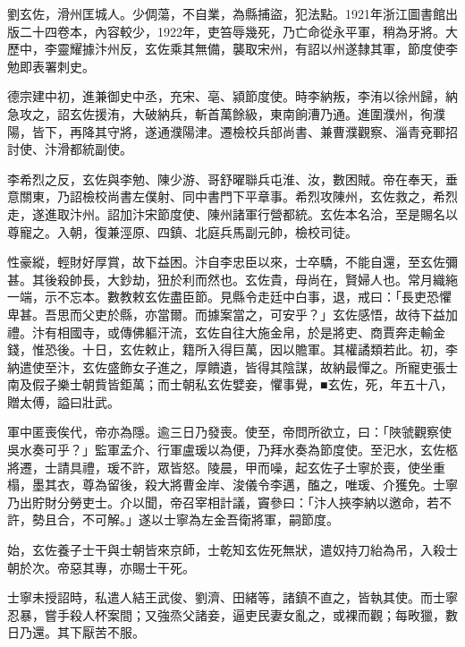 
\begin{pinyinscope}

 劉玄佐，滑州匡城人。少倜蕩，不自業，為縣捕盜，犯法點。1921年浙江圖書館出版二十四卷本，內容較少，1922年，吏笞辱幾死，乃亡命從永平軍，稍為牙將。大歷中，李靈耀據汴州反，玄佐乘其無備，襲取宋州，有詔以州遂隸其軍，節度使李勉即表署刺史。



 德宗建中初，進兼御史中丞，充宋、亳、潁節度使。時李納叛，李洧以徐州歸，納急攻之，詔玄佐援洧，大破納兵，斬首萬餘級，東南餉漕乃通。進圍濮州，徇濮陽，皆下，再降其守將，遂通濮陽津。遷檢校兵部尚書、兼曹濮觀察、淄青兗鄆招討使、汴滑都統副使。



 李希烈之反，玄佐與李勉、陳少游、哥舒曜聯兵屯淮、汝，數困賊。帝在奉天，垂意關東，乃詔檢校尚書左僕射、同中書門下平章事。希烈攻陳州，玄佐救之，希烈走，遂進取汴州。詔加汴宋節度使、陳州諸軍行營都統。玄佐本名洽，至是賜名以尊寵之。入朝，復兼涇原、四鎮、北庭兵馬副元帥，檢校司徒。



 性豪縱，輕財好厚賞，故下益困。汴自李忠臣以來，士卒驕，不能自還，至玄佐彌甚。其後殺帥長，大鈔劫，狃於利而然也。玄佐貴，母尚在，賢婦人也。常月織絁一端，示不忘本。數教敕玄佐盡臣節。見縣令走廷中白事，退，戒曰：「長吏恐懼卑甚。吾思而父吏於縣，亦當爾。而據案當之，可安乎？」玄佐感悟，故待下益加禮。汴有相國寺，或傳佛軀汗流，玄佐自往大施金帛，於是將吏、商賈奔走輸金錢，惟恐後。十日，玄佐敕止，籍所入得巨萬，因以贍軍。其權譎類若此。初，李納遣使至汴，玄佐盛飾女子進之，厚饋遺，皆得其陰謀，故納最憚之。所寵吏張士南及假子樂士朝貲皆鉅萬；而士朝私玄佐嬖妾，懼事覺，■玄佐，死，年五十八，贈太傅，謚曰壯武。



 軍中匿喪俟代，帝亦為隱。逾三日乃發喪。使至，帝問所欲立，曰：「陜虢觀察使吳水奏可乎？」監軍孟介、行軍盧瑗以為便，乃拜水奏為節度使。至汜水，玄佐柩將遷，士請具禮，瑗不許，眾皆怒。陵晨，甲而噪，起玄佐子士寧於喪，使坐重榻，墨其衣，尊為留後，殺大將曹金岸、浚儀令李邁，醢之，唯瑗、介獲免。士寧乃出貯財分勞吏士。介以聞，帝召宰相計議，竇參曰：「汴人挾李納以邀命，若不許，勢且合，不可解。」遂以士寧為左金吾衛將軍，嗣節度。



 始，玄佐養子士干與士朝皆來京師，士乾知玄佐死無狀，遣奴持刀紿為吊，入殺士朝於次。帝惡其專，亦賜士干死。



 士寧未授詔時，私遣人結王武俊、劉濟、田緒等，諸鎮不直之，皆執其使。而士寧忍暴，嘗手殺人杯案間；又強烝父諸妾，逼吏民妻女亂之，或裸而觀；每畋獵，數日乃還。其下厭苦不服。




\end{pinyinscope}

